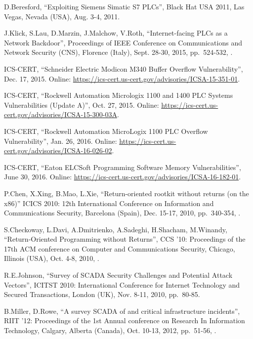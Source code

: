 \begin{thebibliography}{99}
D.Beresford,
``Exploiting Siemens Simatic S7 PLCs'',
Black Hat USA 2011,
Las Vegas, Nevada (USA), Aug. 3-4, 2011.

J.Klick, S.Lau, D.Marzin, J.Malchow, V.Roth,
``Internet-facing PLCs as a Network Backdoor'',
Proceedings of IEEE Conference on Communications and Network Security (CNS),
Florence (Italy), Sept. 28-30, 2015,
pp.\ 524-532,
.

ICS-CERT,
``Schneider Electric Modicon M340 Buffer Overflow Vulnerability'',
Dec. 17, 2015.
Online: \url{https://ics-cert.us-cert.gov/advisories/ICSA-15-351-01}.

ICS-CERT,
``Rockwell Automation Micrologix 1100 and 1400 PLC Systems Vulnerabilities (Update A)'',
Oct. 27, 2015.
Online: \url{https://ics-cert.us-cert.gov/advisories/ICSA-15-300-03A}.

ICS-CERT,
``Rockwell Automation MicroLogix 1100 PLC Overflow Vulnerability'',
Jan. 26, 2016.
Online: \url{https://ics-cert.us-cert.gov/advisories/ICSA-16-026-02}.

ICS-CERT,
``Eaton ELCSoft Programming Software Memory Vulnerabilities'',
June 30, 2016.
Online: \url{https://ics-cert.us-cert.gov/advisories/ICSA-16-182-01}.

P.Chen, X.Xing, B.Mao, L.Xie,
``Return-oriented rootkit without returns (on the x86)''
ICICS 2010: 12th International Conference on Information and Communications Security,
Barcelona (Spain), Dec. 15-17, 2010,
pp.\ 340-354,
.

S.Checkoway, L.Davi, A.Dmitrienko, A.Sadeghi, H.Shacham, M.Winandy,
``Return-Oriented Programming without Returns'',
CCS '10: Proceedings of the 17th ACM conference on Computer and Communications Security,
Chicago, Illinois (USA), Oct. 4-8, 2010,
.

R.E.Johnson,
``Survey of SCADA Security Challenges and Potential Attack Vectors'',
ICITST 2010: International Conference for Internet Technology and Secured Transactions,
London (UK), Nov. 8-11, 2010,
pp.\ 80-85.

B.Miller, D.Rowe,
``A survey SCADA of and critical infrastructure incidents'',
RIIT '12: Proceedings of the 1st Annual conference on Research In Information Technology,
Calgary, Alberta (Canada), Oct. 10-13, 2012,
pp.\ 51-56,
.


\end{thebibliography}
